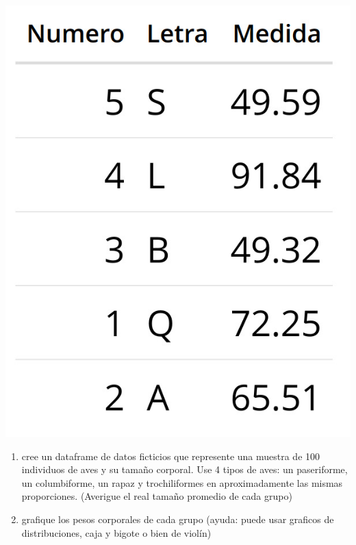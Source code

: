\documentclass[
]{book}
\providecommand{\tightlist}{%
  \setlength{\itemsep}{0pt}\setlength{\parskip}{0pt}}
\begin{document}
\includegraphics[width=8.33in]{df}

\begin{enumerate}
\def\labelenumi{\arabic{enumi}.}
\setcounter{enumi}{14}
\tightlist
\item
  cree un dataframe de datos ficticios que represente una muestra de 100 individuos de aves y su tamaño corporal. Use 4 tipos de aves: un paseriforme, un columbiforme, un rapaz y trochiliformes en aproximadamente las mismas proporciones. (Averigue el real tamaño promedio de cada grupo)
\item
  grafique los pesos corporales de cada grupo (ayuda: puede usar graficos de distribuciones, caja y bigote o bien de violín)
\end{enumerate}

  
\end{document}
